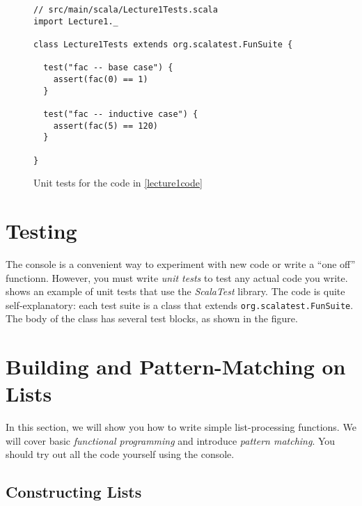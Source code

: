\documentclass[9pt]{extbook}
\begin{document}
\begin{figure}
\lstset{language=scala}
\begin{lstlisting}
// src/main/scala/Lecture1Tests.scala
import Lecture1._

class Lecture1Tests extends org.scalatest.FunSuite {

  test("fac -- base case") {
    assert(fac(0) == 1)
  }

  test("fac -- inductive case") {
    assert(fac(5) == 120)
  }

}
\end{lstlisting}
\caption{Unit tests for the code in \cref{lecture1code}}
\label{lecture1tests}
\end{figure}

\section{Testing}

The \sbt{} console is a convenient way to experiment with new code or write
a ``one off'' functionn. However, you must write \emph{unit tests} to test
any actual code you write.  shows an example of
unit tests that use the \emph{ScalaTest} library. The code is quite self-explanatory:
each test suite is a class that extends \lstinline|org.scalatest.FunSuite|.
The body of the class has several test blocks, as shown in the figure.

\section{Building and Pattern-Matching on Lists}
\lstset{language=scala}

In this section, we will show you how to write simple list-processing functions.
We will cover basic \emph{functional programming} and introduce \emph{pattern
matching}. You should try out all the code yourself using the \sbt{} console.

\subsection{Constructing Lists}
\end{document}
